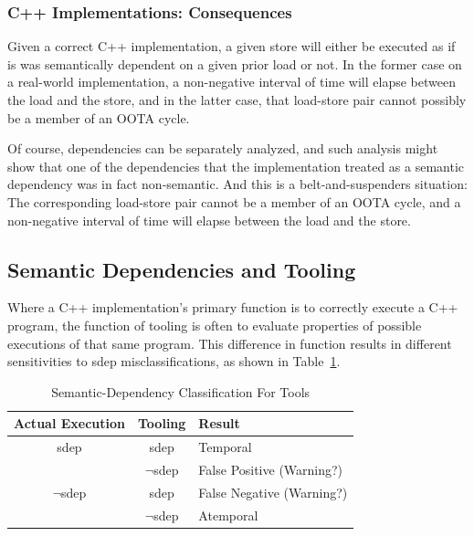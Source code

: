\documentclass[10]{article}
\begin{document}
\subsubsection{C++ Implementations: Consequences}
\label{sec:C++ Implementations: Consequences}

Given a correct C++ implementation, a given store will either be
executed as if is was semantically dependent on a given prior load or
not.
In the former case on a real-world implementation, a non-negative interval
of time will elapse between the load and the store, and in the latter
case, that load-store pair cannot possibly be a member of an OOTA cycle.

Of course, dependencies can be separately analyzed, and such analysis
might show that one of the dependencies that the implementation treated
as a semantic dependency was in fact non-semantic.
And this is a belt-and-suspenders situation:
The corresponding load-store pair cannot be a member of an OOTA cycle,
and a non-negative interval of time will elapse between the load and
the store.

\subsection{Semantic Dependencies and Tooling}
\label{sec:Semantic Dependencies and Tooling}

Where a C++ implementation's primary function is to correctly execute
a C++ program, the function of tooling is often to evaluate properties
of possible executions of that same program.
This difference in function results in different sensitivities to
sdep misclassifications, as shown in
Table~\ref{tab:Semantic-Dependency Classification For Tools}.

\begin{table}
\centering
\begin{tabular}{c|c|l}
Actual Execution	& Tooling		& Result \\
\hline
sdep			& sdep			& Temporal \\
\cline{2-3}
			& $\neg$sdep		& False Positive (Warning?) \\
\hline
$\neg$sdep		& sdep			& False Negative (Warning?) \\
\cline{2-3}
			& $\neg$sdep		& Atemporal \\
\end{tabular}
\caption{Semantic-Dependency Classification For Tools}
\label{tab:Semantic-Dependency Classification For Tools}
\end{table}
\end{document}
